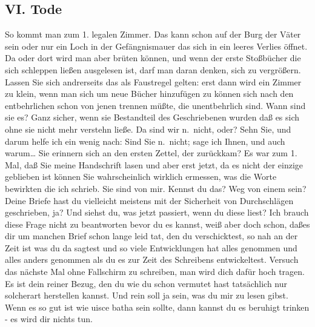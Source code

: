 \documentclass[
]{article}
\author{}
\date{\vspace{-2.5em}}
\begin{document}
\subsection{VI. Tode}\label{vi.-tode}

So kommt man zum 1. legalen Zimmer. Das kann schon auf der Burg der
Väter sein oder nur ein Loch in der Gefängnismauer das sich in ein
leeres Verlies öffnet. Da oder dort wird man aber brüten können, und
wenn der erste Stoßbücher die sich schleppen ließen ausgelesen ist, darf
man daran denken, sich zu vergrößern. Lassen Sie sich andrerseits das
als Faustregel gelten: erst dann wird ein Zimmer zu klein, wenn man sich
um neue Bücher hinzufügen zu können sich nach den entbehrlichen schon
von jenen trennen müßte, die unentbehrlich sind. Wann sind sie es? Ganz
sicher, wenn sie Bestandteil des Geschriebenen wurden daß es sich ohne
sie nicht mehr verstehn ließe. Da sind wir n.~nicht, oder? Sehn Sie, und
darum helfe ich ein wenig nach: Sind Sie n.~nicht; sage ich Ihnen, und
auch warum\ldots{} Sie erinnern sich an den ersten Zettel, der
zurückkam? Es war zum 1. Mal, daß Sie meine Handschrift lasen und aber
erst jetzt, da es nicht der einzige geblieben ist können Sie
wahrscheinlich wirklich ermessen, was die Worte bewirkten die ich
schrieb. Sie sind von mir. Kennst du das? Weg von einem sein? Deine
Briefe hast du vielleicht meistens mit der Sicherheit von Durchschlägen
geschrieben, ja? Und siehst du, was jetzt passiert, wenn du diese liest?
Ich brauch diese Frage nicht zu beantworten bevor du es kannst, weiß
aber doch schon, daßes dir um manchen Brief schon lange leid tat, den du
verschicktest, so nah an der Zeit ist was du da sagtest und so viele
Entwicklungen hat alles genommen und alles anders genommen als du es zur
Zeit des Schreibens entwickeltest. Versuch das nächste Mal ohne
Fallschirm zu schreiben, man wird dich dafür hoch tragen. Es ist dein
reiner Bezug, den du wie du schon vermutet hast tatsächlich nur
solcherart herstellen kannst. Und rein soll ja sein, was du mir zu lesen
gibst. Wenn es so gut ist wie uisce batha sein sollte, dann kannst du es
beruhigt trinken - es wird dir nichts tun.
\end{document}
